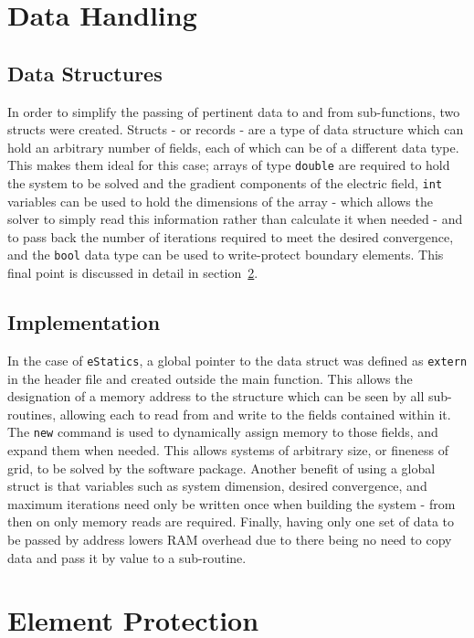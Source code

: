 	\section{Data Handling}
	
		\subsection{Data Structures}
	
		In order to simplify the passing of pertinent data to and from sub-functions, two structs were created. Structs - or records - are a type of data structure which can hold an arbitrary number of fields, each of which can be of a different data type. This makes them ideal for this case; arrays of type \lstinline|double| are required to hold the system to be solved and the gradient components of the electric field, \lstinline|int| variables can be used to hold the dimensions of the array - which allows the solver to simply read this information rather than calculate it when needed - and to pass back the number of iterations required to meet the desired convergence, and the \lstinline|bool| data type can be used to write-protect boundary elements. This final point is discussed in detail in section~\ref{sec:mask}.
		
		\subsection{Implementation}
		
		In the case of \lstinline|eStatics|, a global pointer to the data struct was defined as \lstinline|extern| in the header file and created outside the main function. This allows the designation of a memory address to the structure which can be seen by all sub-routines, allowing each to read from and write to the fields contained within it. The \lstinline|new| command is used to dynamically assign memory to those fields, and expand them when needed. This allows systems of arbitrary size, or fineness of grid, to be solved by the software package. Another benefit of using a global struct is that variables such as system dimension, desired convergence, and maximum iterations need only be written once when building the system - from then on only memory reads are required. Finally, having only one set of data to be passed by address lowers RAM overhead due to there being no need to copy data and pass it by value to a sub-routine.
	
	\section{Element Protection}
	\label{sec:mask}
		
